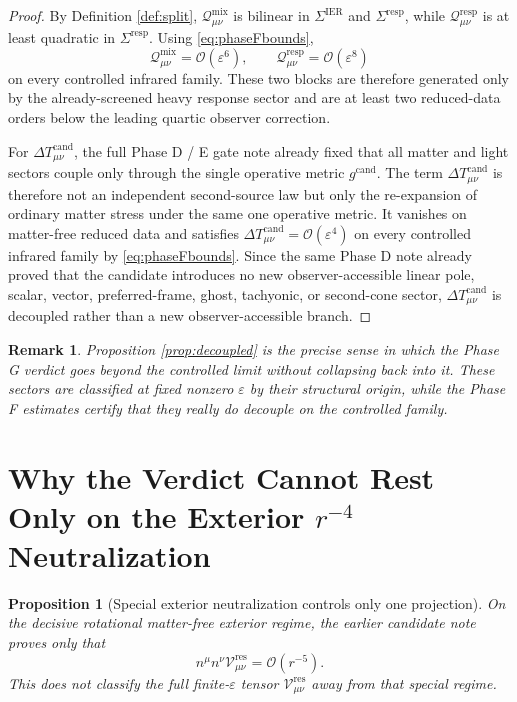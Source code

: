 \documentclass[11pt]{article}
\newcommand{\CandidateMetric}{g^{\mathrm{cand}}}
\newcommand{\BaseShift}{\Sigma^{\mathrm{IER}}}
\newcommand{\ResponseShift}{\Sigma^{\mathrm{resp}}}
\newcommand{\DeltaTCand}{\Delta T_{\mu\nu}^{\mathrm{cand}}}
\newcommand{\MixQuad}{\mathcal Q_{\mu\nu}^{\mathrm{mix}}}
\newcommand{\RespQuad}{\mathcal Q_{\mu\nu}^{\mathrm{resp}}}
\newcommand{\ResidualCore}{\mathcal V_{\mu\nu}^{\mathrm{res}}}
\newcommand{\epsIR}{\varepsilon}
\newtheorem{proposition}{Proposition}
\newtheorem{remark}{Remark}
\begin{document}
\begin{proof}
By Definition \ref{def:split}, \(\MixQuad\) is bilinear in \(\BaseShift\) and \(\ResponseShift\), while \(\RespQuad\) is at least quadratic in \(\ResponseShift\). Using \eqref{eq:phaseFbounds},
\begin{equation}
\MixQuad=\mathcal O(\epsIR^6),
\qquad
\RespQuad=\mathcal O(\epsIR^8)
\label{eq:highorder}
\end{equation}
on every controlled infrared family. These two blocks are therefore generated only by the already-screened heavy response sector and are at least two reduced-data orders below the leading quartic observer correction.

For \(\DeltaTCand\), the full Phase D / E gate note already fixed that all matter and light sectors couple only through the single operative metric \(\CandidateMetric\). The term \(\DeltaTCand\) is therefore not an independent second-source law but only the re-expansion of ordinary matter stress under the same one operative metric. It vanishes on matter-free reduced data and satisfies \(\DeltaTCand=\mathcal O(\epsIR^4)\) on every controlled infrared family by \eqref{eq:phaseFbounds}. Since the same Phase D note already proved that the candidate introduces no new observer-accessible linear pole, scalar, vector, preferred-frame, ghost, tachyonic, or second-cone sector, \(\DeltaTCand\) is decoupled rather than a new observer-accessible branch.
\end{proof}

\begin{remark}
Proposition \ref{prop:decoupled} is the precise sense in which the Phase G verdict goes beyond the controlled limit without collapsing back into it. These sectors are classified at fixed nonzero \(\epsIR\) by their structural origin, while the Phase F estimates certify that they really do decouple on the controlled family.
\end{remark}

\section{Why the Verdict Cannot Rest Only on the Exterior \texorpdfstring{\(r^{-4}\)}{r^-4} Neutralization}

\begin{proposition}[Special exterior neutralization controls only one projection]
\label{prop:outside}
On the decisive rotational matter-free exterior regime, the earlier candidate note proves only that
\begin{equation}
n^\mu n^\nu \ResidualCore
=
\mathcal O(r^{-5}).
\label{eq:extneutral}
\end{equation}
This does not classify the full finite-\(\epsIR\) tensor \(\ResidualCore\) away from that special regime.
\end{proposition}
\end{document}
